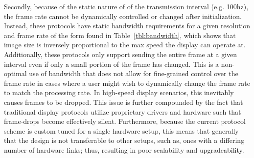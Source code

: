     Secondly, because of the static nature of of the transmission interval (e.g. 100hz), the frame rate cannot be dynamically controlled or changed after initialization. Instead, these protocols have static bandwidth requirements for a given resolution and frame rate of the form found in Table~\ref{tbl:bandwidth}, which shows that image size is inversely proportional to the max speed the display can operate at. Additionally, these protocols only support sending the entire frame at a given interval even if only a small portion of the frame has changed. This is a non-optimal use of bandwidth that does not allow for fine-grained control over the frame rate in cases where a user might wish to dynamically change the frame rate to match the processing rate. In high-speed display scenarios, this inevitably causes frames to be dropped. This issue is further compounded by the fact that traditional display protocols utilize proprietary drivers and hardware such that frame-drops become effectively silent.  Furthermore, because the current protocol scheme is custom tuned for a single hardware setup, this means that generally that the design is not transferable to other setups, such as, ones with a differing number of hardware links; thus, resulting in poor scalability and upgradeability.


